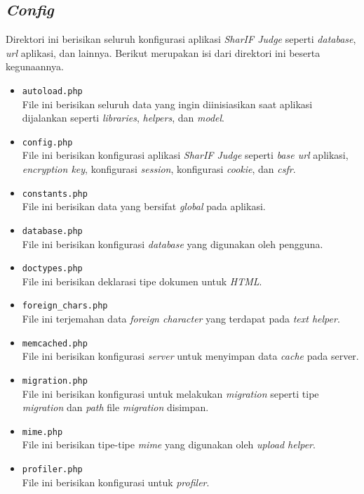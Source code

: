 \subsection{\textit{Config}}
Direktori ini berisikan seluruh konfigurasi aplikasi \textit{SharIF Judge} seperti \textit{database}, \textit{url} aplikasi, dan lainnya. Berikut merupakan isi dari direktori ini beserta kegunaannya.
\begin{itemize}
	\item \texttt{autoload.php} \\File ini berisikan seluruh data yang ingin diinisiasikan saat aplikasi dijalankan seperti \textit{libraries}, \textit{helpers}, dan \textit{model}.
	\item \texttt{config.php} \\File ini berisikan konfigurasi aplikasi \textit{SharIF Judge} seperti \textit{base url} aplikasi, \textit{encryption key}, konfigurasi \textit{session}, konfigurasi \textit{cookie}, dan \textit{csfr}.
	\item \texttt{constants.php} \\File ini berisikan data yang bersifat \textit{global} pada aplikasi.
	\item \texttt{database.php} \\File ini berisikan konfigurasi \textit{database} yang digunakan oleh pengguna.
	\item \texttt{doctypes.php} \\File ini berisikan deklarasi tipe dokumen untuk \textit{HTML}.
	\item \texttt{foreign\_chars.php} \\File ini terjemahan data \textit{foreign character} yang terdapat pada \textit{text helper}.
	\item \texttt{memcached.php} \\File ini berisikan konfigurasi \textit{server} untuk menyimpan data \textit{cache} pada server.
	\item \texttt{migration.php} \\File ini berisikan konfigurasi untuk melakukan \textit{migration} seperti tipe \textit{migration} dan \textit{path} file \textit{migration} disimpan.
	\item \texttt{mime.php} \\File ini berisikan tipe-tipe \textit{mime} yang digunakan oleh \textit{upload helper}.
	\item \texttt{profiler.php} \\File ini berisikan konfigurasi untuk \textit{profiler}.

\end{itemize}
